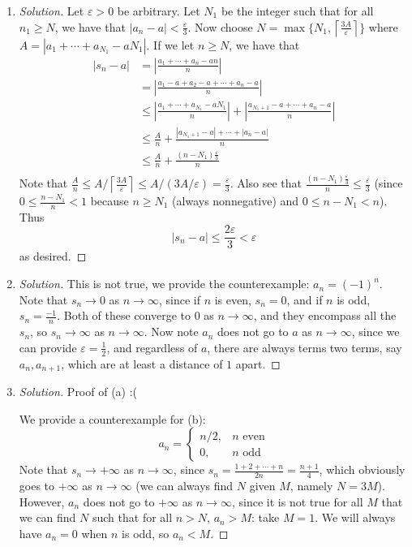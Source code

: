 \documentclass{article}
\newcommand{\ep}{{\varepsilon}}
\begin{document}
\begin{enumerate}
	\item \begin{proof}[Solution]\let\qed\relax
		Let $\ep > 0$ be arbitrary.
		Let $N_1$ be the integer such that for all $n_1 \geq N$,
		we have that $|a_n - a| < \frac{\ep}{3}$.
		Now choose $N = \max\{N_1, \left\lceil\frac{3A}{\ep}\right\rceil\}$
		where $A = |a_1 + \cdots + a_{N_1} - aN_1|$.
		If we let $n \geq N$, we have that
		\begin{align}
			|s_n - a|
			&= \left\lvert \frac{a_1 + \cdots + a_n - an}{n}\right\rvert\\
			&= \left\lvert \frac{a_1 - a + a_2 - a + \cdots + a_n - a}{n}\right\rvert\\
			&\leq \left\lvert \frac{a_1 + \cdots + a_{N_1} - aN_1}{n}\right\rvert
			+ \left\lvert\frac{a_{N_1+1} - a + \cdots + a_n - a}{n}\right\rvert\\
			&\leq \frac{A}{n} + \frac{|a_{N_1+1} - a| + \cdots + |a_n - a|}{n}\\
			&\leq \frac{A}{n} + \frac{(n-N_1)\frac{\ep}{3}}{n}\\
		\end{align}
		Note that $\frac{A}{n} \leq A/\left\lceil\frac{3A}{\ep}\right\rceil \leq
		A/(3A/\ep) = \frac{\ep}{3}$.
		Also see that $\frac{(n-N_1)\frac{\ep}{3}}{n} \leq \frac{\ep}{3}$
		(since $0\leq\frac{n-N_1}{n}<1$ because $n \geq N_1$ (always nonnegative)
		and $0 \leq n-N_1 < n$).
		Thus
		\[
			|s_n - a| \leq \frac{2\ep}{3} < \ep
		\]
		as desired.
	\end{proof}
	\item \begin{proof}[Solution]\let\qed\relax
		This is not true, we provide the counterexample:
		$a_n = (-1)^n$.
		Note that $s_n \to 0$ as $n\to\infty$,
		since if $n$ is even, $s_n = 0$,
		and if $n$ is odd, $s_n = \frac{-1}{n}$.
		Both of these converge to $0$ as $n \to \infty$,
		and they encompass all the $s_n$,
		so $s_n \to \infty$ as $n \to \infty$.
		Now note $a_n$ does not go to $a$ as $n \to \infty$,
		since we can provide $\ep = \frac{1}{2}$,
		and regardless of $a$,
		there are always terms two terms, say $a_n, a_{n+1}$,
		which are at least a distance of $1$ apart.
	\end{proof}
	\item \begin{proof}[Solution]\let\qed\relax
		Proof of (a) :(

		We provide a counterexample for (b):
		\[
			a_n = \begin{cases} n/2, & n\text{ even} \\ 0, & n\text{ odd}\end{cases}
		\]
		Note that $s_n \to +\infty$ as $n \to \infty$,
		since $s_n = \frac{1+2+\cdots+n}{2n} = \frac{n+1}{4}$,
		which obviously goes to $+\infty$ as $n \to \infty$
		(we can always find $N$ given $M$, namely $N = 3M$).
		However, $a_n$ does not go to $+\infty$ as $n \to \infty$,
		since it is not true for all $M$ that we can find $N$ such that for all $n>N$, $a_n>M$: take $M = 1$.
		We will always have $a_n = 0$ when $n$ is odd,
		so $a_n < M$.
	\end{proof} 
\end{enumerate}
\end{document}
